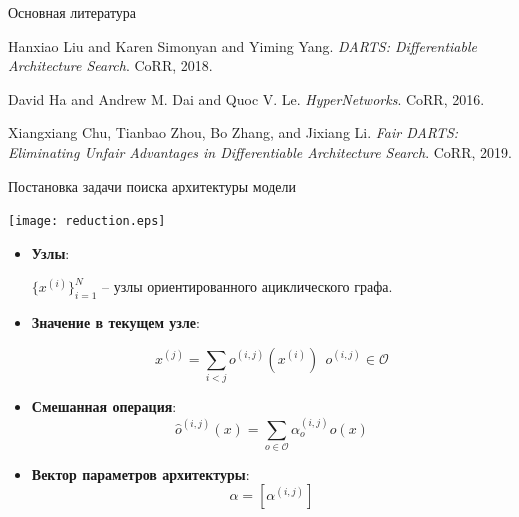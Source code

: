 \documentclass{beamer}
\begin{document}
\begin{frame}{Основная литература}

\begin{thebibliography}{1}


Hanxiao Liu and Karen Simonyan and Yiming Yang. 
\textit{DARTS: Differentiable Architecture Search}.
CoRR, 2018.

David Ha and Andrew M. Dai and Quoc V. Le.
\textit{HyperNetworks}. 
CoRR, 2016.

Xiangxiang Chu, Tianbao Zhou, Bo Zhang, and Jixiang Li.
\textit{Fair DARTS: Eliminating Unfair Advantages in
	Differentiable Architecture Search}.
CoRR, 2019.

\end{thebibliography}			
\end{frame}




\begin{frame}{Постановка задачи поиска архитектуры модели}

\begin{center}
\texttt{[image: reduction.eps]}
\end{center}

\begin{itemize}

\item \textbf{Узлы}:

 $\{x^{(i)}\}_{i=1}^N$ -- узлы ориентированного ациклического графа. 

\item \textbf{Значение в текущем узле}:

 $$x^{(j)} = \sum_{i < j}o^{(i, j)}(x^{(i)})~~o^{(i, j)} \in\mathcal{O}$$


\item \textbf{Смешанная операция}: $$\hat{o}^{(i, j)}(x) = \sum_{o\in \mathcal{O}} \alpha_o^{(i, j)}o(x)$$

\item \textbf{Вектор параметров архитектуры}: $$\alpha = [\alpha^{(i, j)}]$$

\end{itemize}
\end{frame}
\end{document}
